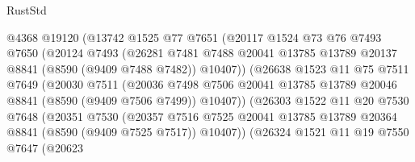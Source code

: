 \begin{lexlean}{RustStd}
\begin{coremodule}
                        @4368
                        @19120
                        (@13742
                          @1525
                          @77
                          @7651
                          (@20117
                            @1524
                            @73
                            @76
                            @7493
                            @7650
                            (@20124
                              @7493
                              (@26281
                                @7481
                                @7488
                                @20041
                                @13785
                                @13789
                                @20137
                                @8841
                                (@8590 (@9409 @7488 @7482))
                                @10407))
                            (@26638
                              @1523
                              @11
                              @75
                              @7511
                              @7649
                              (@20030
                                @7511
                                (@20036
                                  @7498
                                  @7506
                                  @20041
                                  @13785
                                  @13789
                                  @20046
                                  @8841
                                  (@8590 (@9409 @7506 @7499))
                                  @10407))
                              (@26303
                                @1522
                                @11
                                @20
                                @7530
                                @7648
                                (@20351
                                  @7530
                                  (@20357
                                    @7516
                                    @7525
                                    @20041
                                    @13785
                                    @13789
                                    @20364
                                    @8841
                                    (@8590 (@9409 @7525 @7517))
                                    @10407))
                                (@26324
                                  @1521
                                  @11
                                  @19
                                  @7550
                                  @7647
                                  (@20623

\end{coremodule}
\end{lexlean}
